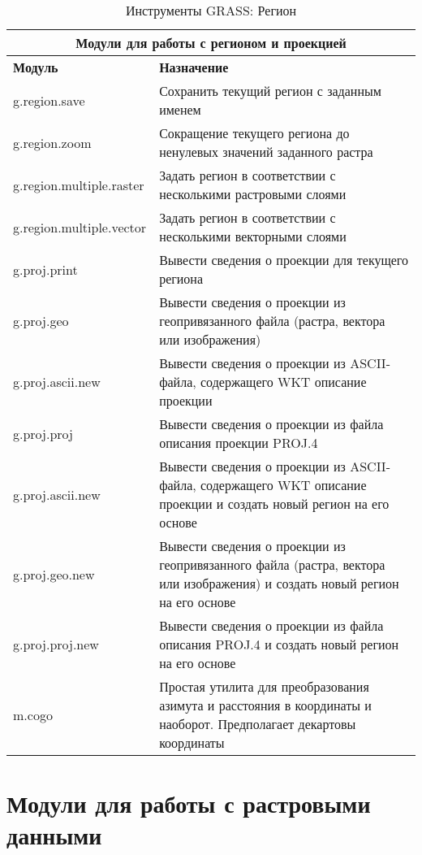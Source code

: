 {\renewcommand{\arraystretch}{0.7}
\begin{table}[H]
\centering
 \begin{tabular}{|p{4cm}|p{10cm}|}
  \hline \multicolumn{2}{|c|}{\textbf{Модули для работы с регионом и проекцией}} \\
  \hline \textbf{Модуль} & \textbf{Назначение} \\
  \hline g.region.save & Сохранить текущий регион с заданным именем \\
  \hline g.region.zoom & Сокращение текущего региона до ненулевых значений
  заданного растра \\
  \hline g.region.multiple.raster & Задать регион в соответствии с
  несколькими растровыми слоями \\
  \hline g.region.multiple.vector & Задать регион в соответствии с
  несколькими векторными слоями \\
  \hline g.proj.print & Вывести сведения о проекции для текущего региона \\
  \hline g.proj.geo & Вывести сведения о проекции из геопривязанного
  файла (растра, вектора или изображения) \\
  \hline g.proj.ascii.new & Вывести сведения о проекции из
  ASCII-файла, содержащего WKT описание проекции \\
  \hline g.proj.proj & Вывести сведения о проекции из файла описания
  проекции PROJ.4 \\
  \hline g.proj.ascii.new & Вывести сведения о проекции из ASCII-файла,
  содержащего WKT описание проекции и создать новый регион на его основе \\
  \hline g.proj.geo.new & Вывести сведения о проекции из геопривязанного
  файла (растра, вектора или изображения) и создать новый регион на его
  основе \\
  \hline g.proj.proj.new & Вывести сведения о проекции из файла описания
  PROJ.4 и создать новый регион на его основе \\
  \hline m.cogo & Простая утилита для преобразования азимута и расстояния
  в координаты и наоборот. Предполагает декартовы координаты \\
\hline
\end{tabular}
\caption{Инструменты GRASS: Регион}
\end{table}}


\section{Модули для работы с растровыми данными}

